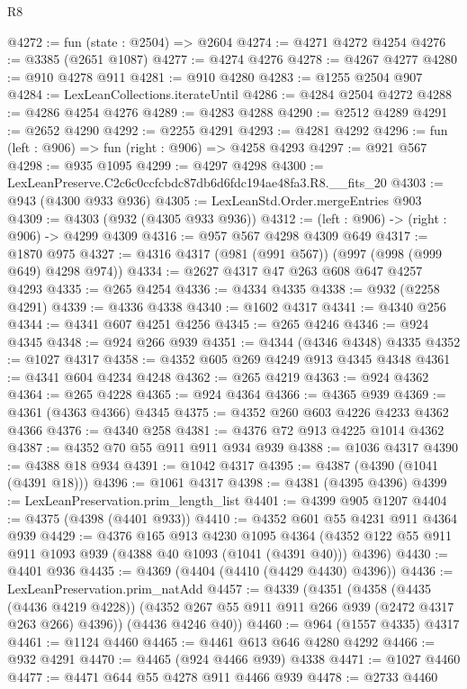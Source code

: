 \begin{lexlean}{R8}
\begin{coremodule}
@4272 := fun (state : @2504) => @2604
@4274 := @4271 @4272 @4254
@4276 := @3385 (@2651 @1087)
@4277 := @4274 @4276
@4278 := @4267 @4277
@4280 := @910 @4278 @911
@4281 := @910 @4280
@4283 := @1255 @2504 @907
@4284 := LexLeanCollections.iterateUntil
@4286 := @4284 @2504 @4272
@4288 := @4286 @4254 @4276
@4289 := @4283 @4288
@4290 := @2512 @4289
@4291 := @2652 @4290
@4292 := @2255 @4291
@4293 := @4281 @4292
@4296 := fun (left : @906) => fun (right : @906) => @4258 @4293
@4297 := @921 @567
@4298 := @935 @1095
@4299 := @4297 @4298
@4300 := LexLeanPreserve.C2c6c0ccfcbdc87db6d6fdc194ae48fa3.R8.__fits_20
@4303 := @943 (@4300 @933 @936)
@4305 := LexLeanStd.Order.mergeEntries @903
@4309 := @4303 (@932 (@4305 @933 @936))
@4312 := (left : @906) -> (right : @906) -> @4299 @4309
@4316 := @957 @567 @4298 @4309 @649
@4317 := @1870 @975
@4327 := @4316 @4317 (@981 (@991 @567)) (@997 (@998 (@999 @649) @4298 @974))
@4334 := @2627 @4317 @47 @263 @608 @647 @4257 @4293
@4335 := @265 @4254
@4336 := @4334 @4335
@4338 := @932 (@2258 @4291)
@4339 := @4336 @4338
@4340 := @1602 @4317
@4341 := @4340 @256
@4344 := @4341 @607 @4251 @4256
@4345 := @265 @4246
@4346 := @924 @4345
@4348 := @924 @266 @939
@4351 := @4344 (@4346 @4348) @4335
@4352 := @1027 @4317
@4358 := @4352 @605 @269 @4249 @913 @4345 @4348
@4361 := @4341 @604 @4234 @4248
@4362 := @265 @4219
@4363 := @924 @4362
@4364 := @265 @4228
@4365 := @924 @4364
@4366 := @4365 @939
@4369 := @4361 (@4363 @4366) @4345
@4375 := @4352 @260 @603 @4226 @4233 @4362 @4366
@4376 := @4340 @258
@4381 := @4376 @72 @913 @4225 @1014 @4362
@4387 := @4352 @70 @55 @911 @911 @934 @939
@4388 := @1036 @4317
@4390 := @4388 @18 @934
@4391 := @1042 @4317
@4395 := @4387 (@4390 (@1041 (@4391 @18)))
@4396 := @1061 @4317
@4398 := @4381 (@4395 @4396)
@4399 := LexLeanPreservation.prim_length_list
@4401 := @4399 @905 @1207
@4404 := @4375 (@4398 (@4401 @933))
@4410 := @4352 @601 @55 @4231 @911 @4364 @939
@4429 := @4376
    @165
    @913
    @4230
    @1095
    @4364
    (@4352 @122 @55 @911 @911 @1093 @939 (@4388 @40 @1093 (@1041 (@4391 @40))) @4396)
@4430 := @4401 @936
@4435 := @4369 (@4404 (@4410 (@4429 @4430) @4396))
@4436 := LexLeanPreservation.prim_natAdd
@4457 := @4339
    (@4351
      (@4358
        (@4435 (@4436 @4219 @4228))
        (@4352 @267 @55 @911 @911 @266 @939 (@2472 @4317 @263 @266) @4396))
      (@4436 @4246 @40))
@4460 := @964 (@1557 @4335) @4317
@4461 := @1124 @4460
@4465 := @4461 @613 @646 @4280 @4292
@4466 := @932 @4291
@4470 := @4465 (@924 @4466 @939) @4338
@4471 := @1027 @4460
@4477 := @4471 @644 @55 @4278 @911 @4466 @939
@4478 := @2733 @4460

\end{coremodule}
\end{lexlean}
